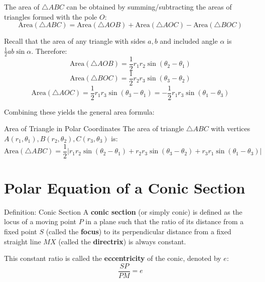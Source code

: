 \documentclass[11pt,a4paper]{article}
\begin{document}
The area of $\triangle ABC$ can be obtained by summing/subtracting the areas of triangles formed with the pole $O$:
$$\text{Area}(\triangle ABC) = \text{Area}(\triangle AOB) + \text{Area}(\triangle AOC) - \text{Area}(\triangle BOC)$$

Recall that the area of any triangle with sides $a, b$ and included angle $\alpha$ is $\frac{1}{2} a b \sin \alpha$. Therefore:
$$\text{Area}(\triangle AOB) = \frac{1}{2} r_1 r_2 \sin(\theta_2 - \theta_1)$$
$$\text{Area}(\triangle BOC) = \frac{1}{2} r_2 r_3 \sin(\theta_3 - \theta_2)$$
$$\text{Area}(\triangle AOC) = \frac{1}{2} r_1 r_3 \sin(\theta_3 - \theta_1) = -\frac{1}{2} r_1 r_3 \sin(\theta_1 - \theta_3)$$

Combining these yields the general area formula:

\begin{formulabox}{Area of Triangle in Polar Coordinates}
The area of triangle $\triangle ABC$ with vertices $A(r_1,\theta_1), B(r_2,\theta_2), C(r_3,\theta_3)$ is:
\begin{equation}
    \text{Area}(\triangle ABC) = \frac{1}{2} \Big| r_1 r_2 \sin(\theta_2 - \theta_1) + r_2 r_3 \sin(\theta_3 - \theta_2) + r_3 r_1 \sin(\theta_1 - \theta_3) \Big|
\end{equation}
\end{formulabox}

\section{Polar Equation of a Conic Section}

\begin{defbox}{Definition: Conic Section}
A \textbf{conic section} (or simply conic) is defined as the locus of a moving point $P$ in a plane such that the ratio of its distance from a fixed point $S$ (called the \textbf{focus}) to its perpendicular distance from a fixed straight line $MX$ (called the \textbf{directrix}) is always constant.

This constant ratio is called the \textbf{eccentricity} of the conic, denoted by $e$:
\begin{equation}
    \frac{SP}{PM} = e
\end{equation}
\end{defbox}
\end{document}
